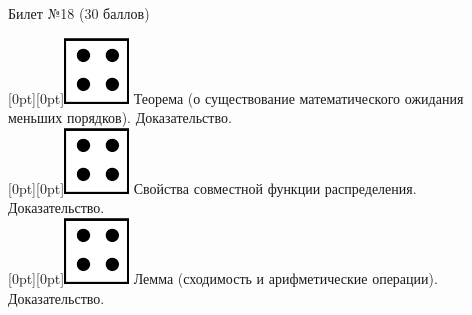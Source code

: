 \documentclass[10pt]{article}
\begin{document}
\thispagestyle{empty}

\topskip=0pt

\vspace*{\fill}

\begin{center} {\Large Билет №18 (30 баллов)} \end{center}

\raisebox{-1pt}[0pt][0pt]{\includegraphics[width=0.02\linewidth]{4.png}} Теорема (о существование математического ожидания меньших порядков). Доказательство. \\

\raisebox{-1pt}[0pt][0pt]{\includegraphics[width=0.02\linewidth]{4.png}} Свойства совместной функции распределения. Доказательство. \\

\raisebox{-1pt}[0pt][0pt]{\includegraphics[width=0.02\linewidth]{4.png}} Лемма (сходимость и арифметические операции). Доказательство. \\









\vspace*{\fill}
\end{document}
